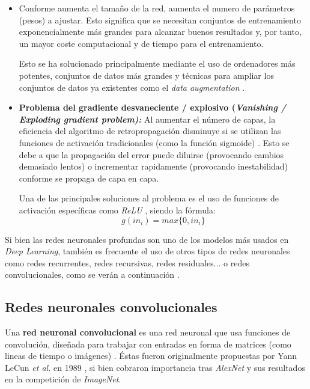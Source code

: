 \begin{itemize}
	\item Conforme aumenta el tamaño de la red, aumenta el numero de parámetros (pesos) a ajustar. Esto significa que se necesitan conjuntos de entrenamiento exponencialmente más grandes para alcanzar buenos resultados y, por tanto, un mayor coste computacional y de tiempo para el entrenamiento.
	
	Esto se ha solucionado principalmente mediante el uso de ordenadores más potentes, conjuntos de datos más grandes y técnicas para ampliar los conjuntos de datos ya existentes como el \textit{data augmentation} \cite{Shorten2019ASO}. 
	
	\item \textbf{Problema del gradiente desvaneciente / explosivo (\textit{Vanishing / Exploding gradient problem):}} Al aumentar el número de capas, la eficiencia del algoritmo de retropropagación disminuye si se utilizan las funciones de activación tradicionales (como la función sigmoide) \cite{gradientKolen}. Esto se debe a que la propagación del error puede diluirse (provocando cambios demasiado lentos) o incrementar rapidamente (provocando inestabilidad) conforme se propaga de capa en capa.
	
	Una de las principales soluciones al problema es el uso de funciones de activación específicas como \textit{ReLU} \cite{Goodfellow-et-al-2016}, siendo la fórmula:
	\[g(in_i)=max\{0,in_i\}\]
\end{itemize}

Si bien las redes neuronales profundas son uno de los modelos más usados en \textit{Deep Learning}, también es frecuente el uso de otros tipos de redes neuronales como redes recurrentes, redes recursivas, redes residuales... o redes convolucionales, como se verán a continuación \cite{Goodfellow-et-al-2016}.

\subsection{Redes neuronales convolucionales}

Una \textbf{red neuronal convolucional} es una red neuronal que usa funciones de convolución, diseñada para trabajar con entradas en forma de matrices (como lineas de tiempo o imágenes) \cite{Goodfellow-et-al-2016}. Éstas fueron originalmente propuestas por Yann LeCun \textit{et al.} en 1989 \cite{10.1162/neco.1989.1.4.541}, si bien cobraron importancia tras \textit{AlexNet} \cite{Krizhevsky2012ImageNetCW} y sus resultados en la competición de \textit{ImageNet}.

